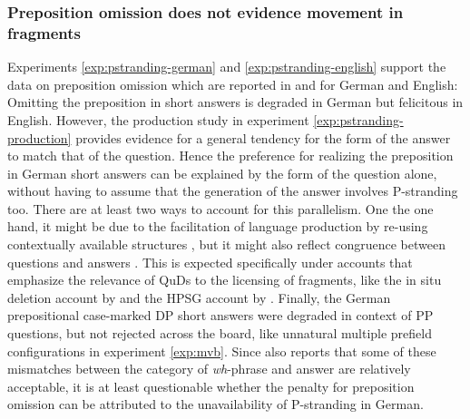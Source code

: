 \subsubsection{Preposition omission does not evidence movement in fragments}
Experiments \ref{exp:pstranding-german} and \ref{exp:pstranding-english} support the data on preposition omission which are reported in \citet{merchant2004} and \citet{merchant.etal2013} for German and English: Omitting the preposition in short answers is degraded in German but felicitous in English. However, the production study in experiment \ref{exp:pstranding-production} provides evidence for a general tendency for the form of the answer to match that of the question. Hence the preference for realizing the preposition in German short answers can be explained by the form of the question alone, without having to assume that the generation of the answer involves P-stranding too. There are at least two ways to account for this parallelism. One the one hand, it might be due to the facilitation of language production by re-using contextually available structures \citep{levelt.kelter1982}, but it might also reflect congruence between questions and answers \citep{reich2002a}. This is expected specifically under accounts that emphasize the relevance of QuDs to the licensing of fragments, like the in situ deletion account by \citet{reich2007} and the HPSG account by \citet{ginzburg.sag2000}. Finally, the German prepositional case-marked DP short answers were degraded in context of PP questions, but not rejected across the board, like unnatural multiple prefield configurations in experiment \ref{exp:mvb}. Since \citet{lemkeaccepted} also reports that some of these mismatches between the category of \textit{wh}-phrase and answer are relatively acceptable, it is at least questionable whether the penalty for preposition omission can be attributed to the unavailability of P-stranding in German.

